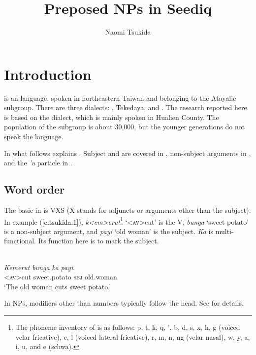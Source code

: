 \documentclass[output=paper
,modfonts
,nonflat]{langsci/langscibook}
\title{Preposed NPs in Seediq}
\author{Naomi Tsukida\affiliation{Aichi Prefectural University}}
\begin{document}
\maketitle

\section{\label{s:tsukida:1}Introduction}

 is an  language, spoken in northeastern Taiwan and belonging to the Atayalic subgroup. There are three  dialects: , Tekedaya, and . The research reported here is based on the  dialect, which is mainly spoken in Hualien County. The population of the  subgroup is about 30,000, but the younger generations do not speak the language.

In what follows  explains  . Subject and  are covered in , non-subject arguments in , and the \textit{'u} particle in .

\subsection{\label{s:tsukida:1.1}Word order}

The basic  in  is VXS (X stands for adjuncts or arguments other than the subject). In example (\ref{e:tsukida:1}), \textit{k<em>erut}\footnote{The phoneme inventory of   is as follows: p, t, k, q, ', b, d, s, x, h, g (voiced velar fricative), c, l (voiced lateral fricative), r, m, n, ng (velar nasal), w, y, a, i, u, and e (schwa).} ‘<\textsc{av}>cut’ is the V, \textit{bunga} ‘sweet potato’ is a non-subject argument, and \textit{payi} ‘old woman’ is the subject. \textit{Ka} is multi-functional. Its function here is to mark the subject. 

\begin{exe}
	\label{e:tsukida:1}\\
	\gll \textit{K}{\USSmaller}\textit{em}{\USGreater}\textit{erut} \textit{bunga} \textit{ka} \textit{payi}.\\
	\textsc{<av>}cut sweet.potato \textsc{sbj} old.woman\\
	\glt ‘The old woman cuts sweet potato.’
\end{exe}

\noindent
In NPs, modifiers other than numbers typically follow the head. See  for details. 
\end{document}
